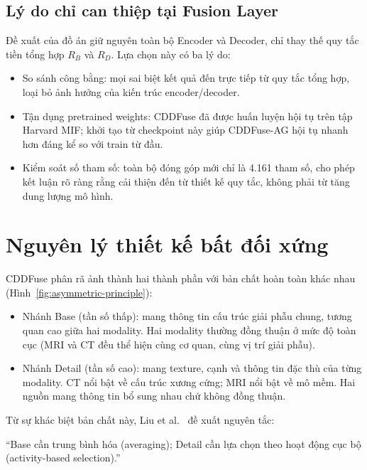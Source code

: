 \subsection{Lý do chỉ can thiệp tại Fusion Layer}
\label{ssec:why-fusion-layer}

Đề xuất của đồ án giữ nguyên toàn bộ Encoder và Decoder, chỉ thay thế quy tắc tiền tổng hợp $R_B$ và $R_D$. Lựa chọn này có ba lý do:

\begin{itemize}\itemsep2pt
    \item So sánh công bằng: mọi sai biệt kết quả đến trực tiếp từ quy tắc tổng hợp, loại bỏ ảnh hưởng của kiến trúc encoder/decoder.
    \item Tận dụng pretrained weights: CDDFuse đã được huấn luyện hội tụ trên tập Harvard MIF; khởi tạo từ checkpoint này giúp CDDFuse-AG hội tụ nhanh hơn đáng kể so với train từ đầu.
    \item Kiểm soát số tham số: toàn bộ đóng góp mới chỉ là 4.161 tham số, cho phép kết luận rõ ràng rằng cải thiện đến từ thiết kế quy tắc, không phải từ tăng dung lượng mô hình.
\end{itemize}

\section{Nguyên lý thiết kế bất đối xứng}
\label{sec:asymmetric-principle}

CDDFuse phân rã ảnh thành hai thành phần với bản chất hoàn toàn khác nhau (Hình~\ref{fig:asymmetric-principle}):

\begin{itemize}\itemsep0pt
    \item Nhánh Base (tần số thấp): mang thông tin cấu trúc giải phẫu chung, tương quan cao giữa hai modality. Hai modality thường đồng thuận ở mức độ toàn cục (MRI và CT đều thể hiện cùng cơ quan, cùng vị trí giải phẫu).
    \item Nhánh Detail (tần số cao): mang texture, cạnh và thông tin đặc thù của từng modality. CT nổi bật về cấu trúc xương cứng; MRI nổi bật về mô mềm. Hai nguồn mang thông tin bổ sung nhau chứ không đồng thuận.
\end{itemize}

Từ sự khác biệt bản chất này, Liu et al.\ \cite{liu2018survey} đề xuất nguyên tắc:
\begin{center}
``Base cần trung bình hóa (averaging); Detail cần lựa chọn theo hoạt động cục bộ (activity-based selection).''
\end{center}

